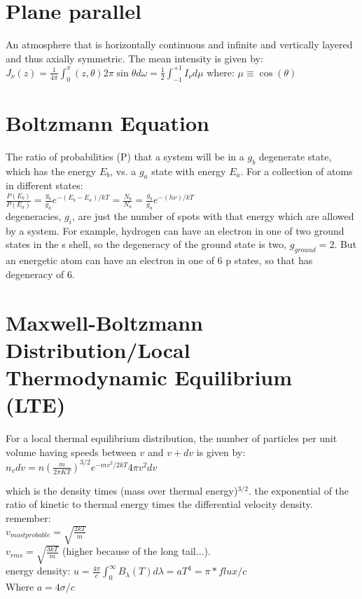 \documentclass[12pt]{report}
\begin{document}
 \section{Plane parallel}
 
 An atmosphere that is horizontally continuous and infinite and vertically layered and thus axially symmetric. 
The mean intensity is given by: 
\( J_\nu(z)=\frac{1}{4\pi}\int_0^\pi(z,\theta)2\pi \sin\theta d\omega= \frac{1}{2}\int_{-1}^{+1}I_\nu d\mu\)
where:
$\mu \equiv \cos(\theta)$

\section{Boltzmann Equation}
 The ratio of probabilities (P) that a system will be in a $g_b$ degenerate state, which has the energy  $E_b$, vs. a $g_a$ state with energy $E_a$. For a collection of atoms in different states:\\
 $\frac{P(E_b)}{P(E_a)} =\frac{g_b}{g_a}e^{-(E_b-E_a)/kT}=\frac{N_b}{N_a}=\frac{g_b}{g_a}e^{-(h\nu)/kT}$\\
degeneracies, $g_i$, are just the number of spots with that energy which are allowed by a system. For example, hydrogen can have an electron in one of two ground states in the s shell, so the degeneracy of the ground state is two, $g_{ground}=2$. But an energetic atom can have an electron in one of 6 p states, so that has degeneracy of 6.
 
 \section{Maxwell-Boltzmann Distribution/Local Thermodynamic Equilibrium (LTE)}
 For a local thermal equilibrium distribution, the number of particles per unit volume having speeds between $v$ and $v+dv$ is given by:\\
 
 $n_vdv=n(\frac{m}{2\pi KT})^{3/2} e^{-mv^2/2kT}4\pi v^2 dv$ 
 
 which is the density times   (mass over thermal energy)$^{3/2}$.
   the exponential of the ratio of kinetic to thermal energy times the differential velocity density.
 remember: \\
$ v_{most probable}=\sqrt{\frac{2kT}{m}}$ \\
$v_{rms}=\sqrt{\frac{3kT}{m}}$ (higher because of the long tail...).\\

 energy density: $u=\frac{4\pi}{c}\int_0^\infty B_\lambda(T)d\lambda=aT^4=\pi*flux/c$\\
 Where  $a=4\sigma/c$\\
\end{document}
